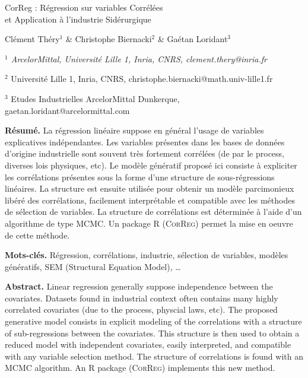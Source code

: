 \documentclass[12pt]{article}
\begin{document}
     \def\Var{{\rm Var}\,}


\begin{center}
{\Large
	{\sc  CorReg : Régression sur variables Corrélées\\ et Application à l'industrie Sidérurgique}
}
\bigskip

  Clément Théry$^{1}$ \& Christophe Biernacki$^{2}$ \& Gaétan Loridant$^{3}$
\bigskip

{\it
$^{1}$ ArcelorMittal, Université Lille 1, Inria, CNRS, clement.thery@inria.fr
 
$^{2}$ Université Lille 1, Inria, CNRS, christophe.biernacki@math.univ-lille1.fr

$^{3}$ Etudes Industrielles ArcelorMittal Dunkerque, gaetan.loridant@arcelormittal.com\textbf{}
}
\end{center}
\bigskip


{\bf Résumé.} La régression linéaire suppose en général l'usage de variables explicatives indépendantes. Les variables présentes dans les bases de données d'origine industrielle sont souvent très fortement corrélées (de par le process, diverses lois physiques, etc). Le modèle génératif proposé ici consiste à expliciter les corrélations présentes sous la forme d'une structure de sous-régressions linéaires. La structure est ensuite utilisée pour obtenir un modèle parcimonieux libéré des corrélations, facilement interprétable et compatible avec les méthodes de sélection de variables. La structure de corrélations est déterminée à l'aide d'un algorithme de type MCMC. Un package R (\textsc{CorReg}) permet la mise en oeuvre de cette méthode. 
\smallskip

{\bf Mots-clés.} Régression, corrélations, industrie, sélection de variables, modèles génératifs, SEM (Structural Equation Model), \ldots
\bigskip\bigskip

{\bf Abstract.} Linear regression generally suppose independence between the covariates. Datasets found in industrial context often contains many highly correlated covariates (due to the process, physcial laws, etc). The proposed generative model consists in explicit modeling of the correlations with a structure of sub-regressions between the covariates. This structure is then used to obtain a reduced model with independent covariates, easily interpreted, and compatible with any variable selection method. The structure of correlations is found with an MCMC algorithm. An R package (\textsc{CorReg}) implements this new method.  
\smallskip
\end{document}
